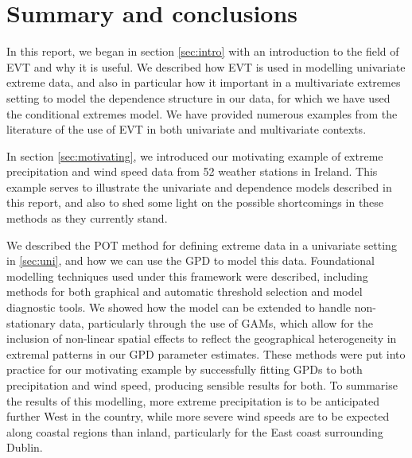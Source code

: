 \documentclass{article}
\numberwithin{equation}{section}
\begin{document}
\section{Summary and conclusions}

In this report, we began in section \ref{sec:intro} with an introduction to the field of EVT and why it is useful.
We described how EVT is used in modelling univariate extreme data, and also in particular how it important in a multivariate extremes setting to model the dependence structure in our data, for which we have used the conditional extremes model.
We have provided numerous examples from the literature of the use of EVT in both univariate and multivariate contexts. 

In section \ref{sec:motivating}, we introduced our motivating example of extreme precipitation and wind speed data from 52 weather stations in Ireland. 
This example serves to illustrate the univariate and dependence models described in this report, and also to shed some light on the possible shortcomings in these methods as they currently stand.

We described the POT method for defining extreme data in a univariate setting in \ref{sec:uni}, and how we can use the GPD to model this data. 
Foundational modelling techniques used under this framework were described, including methods for both graphical and automatic threshold selection and model diagnostic tools. 
We showed how the model can be extended to handle non-stationary data, particularly through the use of GAMs, which allow for the inclusion of non-linear spatial effects to reflect the  geographical heterogeneity in extremal patterns in our GPD parameter estimates. 
These methods were put into practice for our motivating example by successfully fitting GPDs to both precipitation and wind speed, producing sensible results for both. 
To summarise the results of this modelling, more extreme precipitation is to be anticipated further West in the country, while more severe wind speeds are to be expected along coastal regions than inland, particularly for the East coast surrounding Dublin. 
\end{document}
